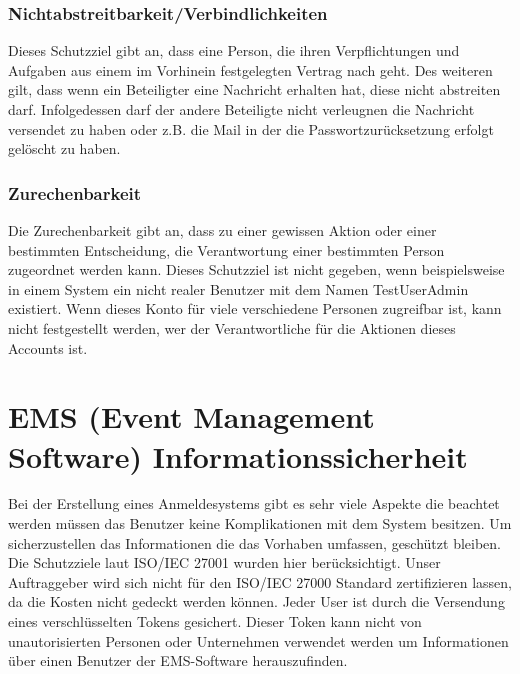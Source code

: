 \subsubsection{Nichtabstreitbarkeit/Verbindlichkeiten}
Dieses Schutzziel gibt an, dass eine Person, die ihren Verpflichtungen und Aufgaben aus einem im Vorhinein festgelegten Vertrag nach geht. Des weiteren gilt, dass wenn ein Beteiligter eine Nachricht erhalten hat, diese nicht abstreiten darf. Infolgedessen darf der andere Beteiligte nicht verleugnen die Nachricht versendet zu haben oder z.B. die Mail in der die Passwortzurücksetzung erfolgt gelöscht zu haben.

\subsubsection{Zurechenbarkeit}
Die Zurechenbarkeit gibt an, dass zu einer gewissen Aktion oder einer bestimmten Entscheidung, die Verantwortung einer bestimmten Person zugeordnet werden kann. Dieses Schutzziel ist nicht gegeben, wenn beispielsweise in einem System ein nicht realer Benutzer mit dem Namen TestUserAdmin existiert. Wenn dieses Konto für viele verschiedene Personen zugreifbar ist, kann nicht festgestellt werden, wer der Verantwortliche für die Aktionen dieses Accounts ist.

\section{EMS (Event Management Software) Informationssicherheit}
Bei der Erstellung eines Anmeldesystems gibt es sehr viele Aspekte die beachtet werden müssen das Benutzer keine Komplikationen mit dem System besitzen. Um sicherzustellen das Informationen die das Vorhaben umfassen, geschützt bleiben. Die Schutzziele laut ISO/IEC 27001 wurden hier berücksichtigt. Unser Auftraggeber wird sich nicht für den ISO/IEC 27000 Standard zertifizieren lassen, da die Kosten nicht gedeckt werden können.
Jeder User ist durch die Versendung eines verschlüsselten Tokens gesichert. Dieser Token kann nicht von unautorisierten Personen oder Unternehmen verwendet werden um Informationen über einen Benutzer der EMS-Software herauszufinden. 

\newpage